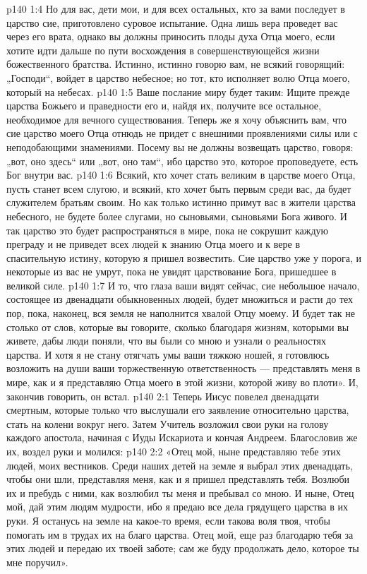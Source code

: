 \vs p140 1:4 Но для вас, дети мои, и для всех остальных, кто за вами последует в царство сие, приготовлено суровое испытание. Одна лишь вера проведет вас через его врата, однако вы должны приносить плоды духа Отца моего, если хотите идти дальше по пути восхождения в совершенствующейся жизни божественного братства. Истинно, истинно говорю вам, не всякий говорящий: „Господи“, войдет в царство небесное; но тот, кто исполняет волю Отца моего, который на небесах.
\vs p140 1:5 Ваше послание миру будет таким: Ищите прежде царства Божьего и праведности его и, найдя их, получите все остальное, необходимое для вечного существования. Теперь же я хочу объяснить вам, что сие царство моего Отца отнюдь не придет с внешними проявлениями силы или с неподобающими знамениями. Посему вы не должны возвещать царство, говоря: „вот, оно здесь“ или „вот, оно там“, ибо царство это, которое проповедуете, есть Бог внутри вас.
\vs p140 1:6 Всякий, кто хочет стать великим в царстве моего Отца, пусть станет всем слугою, и всякий, кто хочет быть первым среди вас, да будет служителем братьям своим. Но как только истинно примут вас в жители царства небесного, не будете более слугами, но сыновьями, сыновьями Бога живого. И так царство это будет распространяться в мире, пока не сокрушит каждую преграду и не приведет всех людей к знанию Отца моего и к вере в спасительную истину, которую я пришел возвестить. Сие царство уже у порога, и некоторые из вас не умрут, пока не увидят царствование Бога, пришедшее в великой силе.
\vs p140 1:7 И то, что глаза ваши видят сейчас, сие небольшое начало, состоящее из двенадцати обыкновенных людей, будет множиться и расти до тех пор, пока, наконец, вся земля не наполнится хвалой Отцу моему. И будет так не столько от слов, которые вы говорите, сколько благодаря жизням, которыми вы живете, дабы люди поняли, что вы были со мною и узнали о реальностях царства. И хотя я не стану отягчать умы ваши тяжкою ношей, я готовлюсь возложить на души ваши торжественную ответственность --- представлять меня в мире, как и я представляю Отца моего в этой жизни, которой живу во плоти». И, закончив говорить, он встал.
\vs p140 2:1 Теперь Иисус повелел двенадцати смертным, которые только что выслушали его заявление относительно царства, стать на колени вокруг него. Затем Учитель возложил свои руки на голову каждого апостола, начиная с Иуды Искариота и кончая Андреем. Благословив же их, воздел руки и молился:
\vs p140 2:2 «Отец мой, ныне представляю тебе этих людей, моих вестников. Среди наших детей на земле я выбрал этих двенадцать, чтобы они шли, представляя меня, как и я пришел представлять тебя. Возлюби их и пребудь с ними, как возлюбил ты меня и пребывал со мною. И ныне, Отец мой, дай этим людям мудрости, ибо я предаю все дела грядущего царства в их руки. Я останусь на земле на какое\hyp{}то время, если такова воля твоя, чтобы помогать им в трудах их на благо царства. Отец мой, еще раз благодарю тебя за этих людей и передаю их твоей заботе; сам же буду продолжать дело, которое ты мне поручил».

